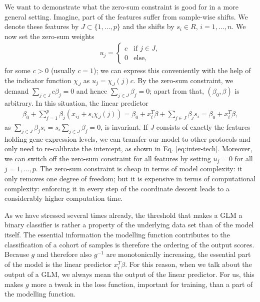 We want to demonstrate what the zero-sum constraint is good for in a more general setting. Imagine, 
part of the features suffer from sample-wise 
shifts. We denote these features by $J \subset \{1, \ldots, p\}$ and the shifts by $s_i \in R$, 
$i = 1, \ldots, n$. We now set the zero-sum 
weights  
\begin{align}
    u_j =
    \begin{cases}
        c & \text{if } j \in J, \\
        0 & \text{else},
    \end{cases}
\end{align}
for some $c > 0$ (usually $c = 1$); we can express this conveniently with the help of the indicator 
function $\chi_J$ as $u_j = \chi_J(j) c$. By the zero-sum constraint, we demand 
$\sum_{j \in J} c \beta_j = 0$  
and hence $\sum_{j \in J} \beta_j = 0$; apart from that, $(\beta_0, \beta)$ is arbitrary. 
In this situation, the linear predictor 
\begin{align}
    \beta_0 + \sum_{j=1}^p \beta_j (x_{ij} + s_i \chi_J(j))
    = \beta_0 + x_i^T \beta + \sum_{j \in J} \beta_j s_i = \beta_0 + x_i^T \beta,
\end{align}
as $\sum_{j \in J} \beta_j s_i = s_i \sum_{j \in J} \beta_j = 0$, is invariant. If $J$ consists of 
exactly the features holding gene-expression levels, we can transfer our model to other protocols 
and only need to re-calibrate the intercept, as shown in Eq. \eqref{eq:inter-tech}. Moreover, we 
can switch off the zero-sum constraint for all features by setting $u_j = 0$ for all 
$j = 1, \ldots, p$. The zero-sum constraint is cheap in terms of model complexity: it only removes 
one degree of freedom; but it is expensive in terms of computational complexity: enforcing it in
every step of the coordinate descent leads to a considerably higher computation time. 

As we have stressed several times already, the threshold that makes a GLM a binary classifier 
is rather a property of the underlying data set than of the model itself. The essential information 
the modelling function contributes to the classification of a cohort of samples is therefore the 
ordering of the output scores. Because $g$ and therefore also $g^{-1}$ are monotonically increasing, 
the essential part of the model is the linear predictor $x_i^T \beta$. For this reason, when we 
talk about the output of a GLM, we always mean the output of the linear predictor. For us, this 
makes $g$ more a tweak in the loss function, important for training, than a part of the modelling 
function.

